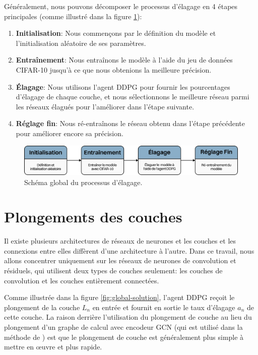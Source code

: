 Généralement, nous pouvons décomposer le processus d'élagage en 4 étapes principales (comme illustré dans la figure \ref{fig:global-schema}):
\begin{enumerate}
    \item \textbf{Initialisation}: Nous commençons par le définition du modèle et l'initialisation aléatoire de ses paramètres.
    \item \textbf{Entraînement}: Nous entraînons le modèle à l'aide du jeu de données CIFAR-10 jusqu'à ce que nous obtenions la meilleure précision.
    \item \textbf{Élagage}: Nous utilisons l'agent DDPG pour fournir les pourcentages d'élagage de chaque couche, et nous sélectionnons le meilleure réseau parmi les réseaux élagués pour l'améliorer dans l'étape suivante.
    \item \textbf{Réglage fin}: Nous ré-entraînons le réseau obtenu dans l'étape précédente pour améliorer encore sa précision.
\end{enumerate}

\begin{figure}[hbt!]
  \centering
  \includegraphics[width=14cm]{images_pfe/schema-general.png}
  \caption{Schéma global du processus d'élagage.}
  \label{fig:global-schema}
\end{figure}
\FloatBarrier
\medskip

\section{Plongements des couches}
Il existe plusieurs architectures de réseaux de neurones et les couches et les connexions entre elles diffèrent d’une architecture à l’autre. Dans ce travail, nous allons concentrer uniquement sur les réseaux de neurones de convolution et résiduels, qui utilisent deux types de couches seulement: les couches de convolution et les couches entièrement connectées.

Comme illustrée dans la figure \ref{fig:global-solution}, l'agent DDPG reçoit le plongement de la couche $L_n$ en entrée et fournit en sortie le taux d'élagage $a_n$ de cette couche. La raison derrière l'utilisation du plongement de couche au lieu du plongement d'un graphe de calcul avec encodeur GCN (qui est utilisé dans la méthode de \cite{pfe2022}) est que le plongement de couche est généralement plus simple à mettre en œuvre et plus rapide.

